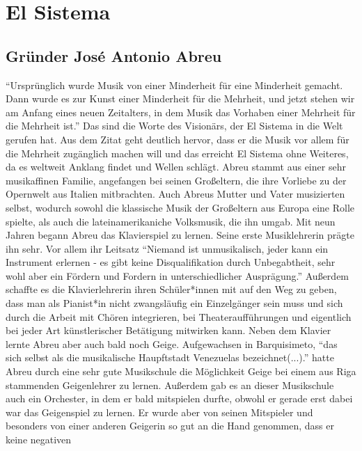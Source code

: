 \section{El Sistema}

\subsection{Gründer José Antonio Abreu}

\enquote{Ursprünglich wurde Musik von einer Minderheit für eine Minderheit
gemacht. Dann wurde es zur Kunst einer Minderheit für die Mehrheit, und jetzt
stehen wir am Anfang eines neuen Zeitalters, in dem Musik das Vorhaben einer
Mehrheit für die Mehrheit ist.} \autocite[5]{kaufmann:el_sistema} Das sind die
Worte des Visionärs, der El Sistema in die Welt gerufen hat. Aus dem Zitat geht
deutlich hervor, dass er die Musik vor allem für die Mehrheit zugänglich machen
will und das erreicht El Sistema ohne Weiteres, da es weltweit Anklang findet
und Wellen schlägt. Abreu stammt aus einer sehr musikaffinen Familie, angefangen
bei seinen Großeltern, die ihre Vorliebe zu der Opernwelt aus Italien
mitbrachten. Auch Abreus Mutter und Vater musizierten selbst, wodurch sowohl die
klassische Musik der Großeltern aus Europa eine Rolle spielte, als auch die
lateinamerikaniche Volksmusik, die ihn umgab. Mit neun Jahren begann Abreu das
Klavierspiel zu lernen. Seine erste Musiklehrerin prägte ihn sehr. Vor allem ihr
Leitsatz \enquote{Niemand ist unmusikalisch, jeder kann ein Instrument erlernen
- es gibt keine Disqualifikation durch Unbegabtheit, sehr wohl aber ein Fördern
und Fordern in unterschiedlicher Ausprägung.} \autocite[20]{kaufmann:el_sistema}
Außerdem schaffte es die Klavierlehrerin ihren Schüler*innen mit auf den Weg zu
geben, dass man als Pianist*in nicht zwangsläufig ein Einzelgänger sein muss und
sich durch die Arbeit mit Chören integrieren, bei Theateraufführungen und
eigentlich bei jeder Art künstlerischer Betätigung mitwirken kann. Neben dem
Klavier lernte Abreu aber auch bald noch Geige. Aufgewachsen in Barquisimeto,
\enquote{das sich selbst als die musikalische Haupftstadt Venezuelas
bezeichnet(...).} \autocite[22]{kaufmann:el_sistema} hatte Abreu durch eine sehr
gute Musikschule die Möglichkeit Geige bei einem aus Riga stammenden
Geigenlehrer zu lernen. Außerdem gab es an dieser Musikschule auch ein
Orchester, in dem er bald mitspielen durfte, obwohl er gerade erst dabei war das
Geigenspiel zu lernen. Er wurde aber von seinen Mitspieler und besonders von
einer anderen Geigerin so gut an die Hand genommen, dass er keine negativen
